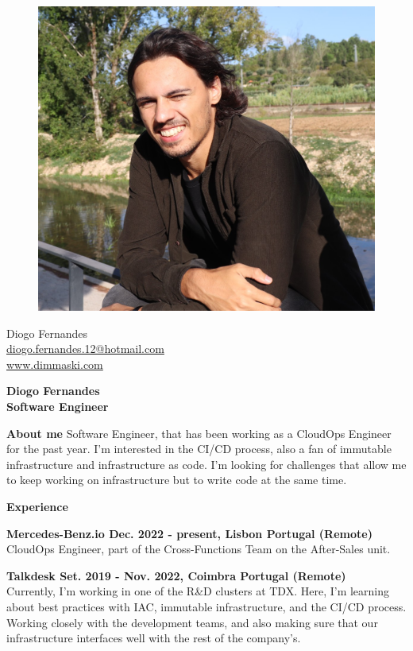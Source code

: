 \documentclass[a4paper,12pt,final]{memoir}
\newcommand{\Sep}{\vspace{1.5em}}
\newcommand{\SmallSep}{\vspace{0.5em}}
\newenvironment{AboutMe}
	{\ignorespaces\textbf{\color{RoyalBlue} About me}}
	{\Sep\ignorespacesafterend}
\newcommand{\CVSection}[1]
	{\Large\textbf{#1}\par
	\SmallSep\normalsize\normalfont}
\newcommand{\CVItem}[1]
	{\textbf{\color{RoyalBlue} #1}}
\begin{document}
%
\begin{figure}
	\hfill
	\includegraphics[width=0.6\columnwidth]{cv-photo.jpg}
	\vspace{-7cm}
\end{figure}

\begin{flushright}\small
	Diogo Fernandes \\
	\url{diogo.fernandes.12@hotmail.com}  \\
	\url{www.dimmaski.com} \\
\end{flushright}\normalsize
\framebreak


\Huge\bfseries {\color{RoyalBlue} Diogo Fernandes} \\
\Large\bfseries  Software Engineer \\

\normalsize\normalfont

\begin{AboutMe}
Software Engineer, that has been working as a CloudOps Engineer for the past year. I'm interested in the CI/CD process, also a fan of immutable infrastructure and infrastructure as code. I'm looking for challenges that allow me to keep working on infrastructure but to write code at the same time.
\end{AboutMe}

\CVSection{Experience}
\CVItem{Mercedes-Benz.io Dec. 2022 - present, Lisbon Portugal (Remote)}\\
CloudOps Engineer, part of the Cross-Functions Team on the After-Sales unit.
\SmallSep

\CVItem{Talkdesk Set. 2019 - Nov. 2022, Coimbra Portugal (Remote)}\\
Currently, I'm working in one of the R\&D clusters at TDX. Here, I'm learning about best practices with IAC, immutable infrastructure, and the CI/CD process. Working closely with the development teams, and also making sure that our infrastructure interfaces well with the rest of the company's.
\SmallSep
\end{document}
